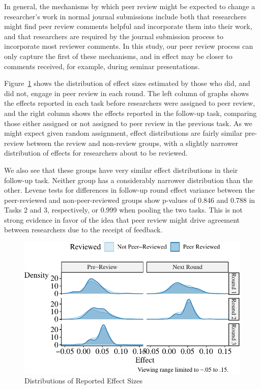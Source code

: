 \documentclass[
  letterpaper,
  DIV=11,
  numbers=noendperiod]{scrartcl}
\begin{document}
In general, the mechanisms by which peer review might be expected to
change a researcher's work in normal journal submissions include both
that researchers might find peer review comments helpful and incorporate
them into their work, and that researchers are required by the journal
submission process to incorporate most reviewer comments. In this study,
our peer review process can only capture the first of these mechanisms,
and in effect may be closer to comments received, for example, during
seminar presentations.

Figure~\ref{fig-peer-review-effect-distributions} shows the distribution
of effect sizes estimated by those who did, and did not, engage in peer
review in each round. The left column of graphs shows the effects
reported in each task before researchers were assigned to peer review,
and the right column shows the effects reported in the follow-up task,
comparing those either assigned or not assigned to peer review in the
previous task. As we might expect given random assignment, effect
distributions are fairly similar pre-review between the review and
non-review groups, with a slightly narrower distribution of effects for
researchers about to be reviewed.

We also see that these groups have very similar effect distributions in
their follow-up task. Neither group has a considerably narrower
distribution than the other. Levene tests for differences in follow-up
round effect variance between the peer-reviewed and non-peer-reviewed
groups show p-values of 0.846 and 0.788 in Tasks 2 and 3, respectively,
or 0.999 when pooling the two tasks. This is not strong evidence in
favor of the idea that peer review might drive agreement between
researchers due to the receipt of feedback.

\begin{figure}

{\centering \includegraphics{The-Sources-of-Researcher-Variation-in-Economics_files/figure-pdf/fig-peer-review-effect-distributions-1.pdf}

}

\caption{\label{fig-peer-review-effect-distributions}Distributions of
Reported Effect Sizes}

\end{figure}
\end{document}
